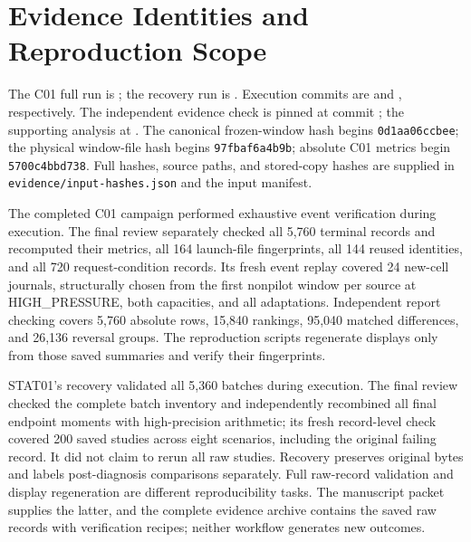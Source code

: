 \FloatBarrier
\section{Evidence Identities and Reproduction Scope}\label{app:evidence}
The C01 full run is ; the recovery run is
. Execution commits are
\texttt{} and
\texttt{}, respectively.
The independent evidence check is pinned at commit
\texttt{}; the supporting analysis at
\texttt{}.
The canonical frozen-window hash begins \texttt{0d1aa06ccbee}; the physical
window-file hash begins \texttt{97fbaf6a4b9b}; absolute C01 metrics begin
\texttt{5700c4bbd738}. Full hashes, source paths, and stored-copy hashes
are supplied in \texttt{evidence/input-hashes.json} and the input manifest.

The completed C01 campaign performed exhaustive event verification during execution. The final review separately checked all
5,760 terminal records and recomputed their metrics, all 164 launch-file
fingerprints, all 144 reused identities, and all 720 request-condition
records. Its fresh event replay covered 24 new-cell journals, structurally
chosen from the first nonpilot window per source at HIGH\_PRESSURE, both
capacities, and all adaptations. Independent report checking covers
5,760 absolute rows, 15,840 rankings, 95,040 matched differences, and
26,136 reversal groups. The reproduction scripts regenerate displays only from those saved
summaries and verify their fingerprints.

STAT01's recovery validated all 5,360 batches during execution. The final
review checked the complete batch inventory and independently recombined
all final endpoint moments with high-precision arithmetic; its fresh
record-level check covered 200 saved studies across eight scenarios,
including the original failing record. It did not claim to rerun all raw
studies. Recovery preserves original bytes and labels post-diagnosis
comparisons separately. Full raw-record validation and display regeneration
are different reproducibility tasks. The manuscript packet supplies the
latter, and the complete evidence archive contains the saved raw
records with verification recipes; neither workflow generates new outcomes.


